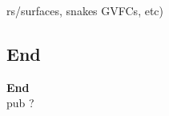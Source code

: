 \documentclass[9pt]{beamer}
\begin{document}
\begin{frame}
\begin{itemize}
rs/surfaces, snakes GVFCs, etc) 
\end{itemize}
\end{frame}
\subsection{End}
		\begin{frame}
				\begin{center}
				\textbf{End}\\
		
				{\Huge{pub ?}}
				\end{center}
			


	\end{frame}


	
	
\end{document}
